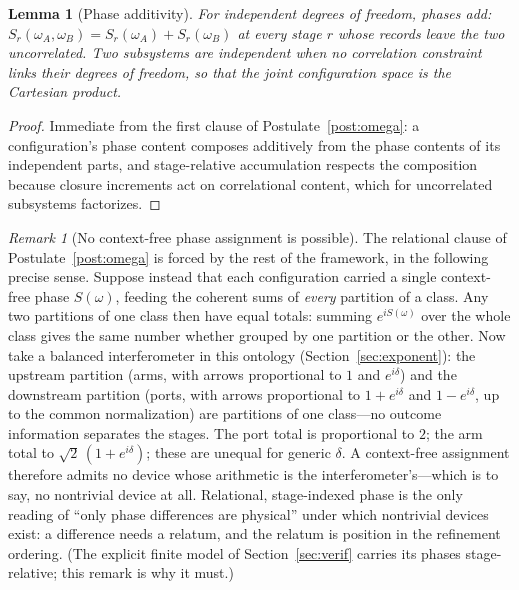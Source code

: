 \documentclass[11pt]{article}
\newtheorem{lemma}{Lemma}
\theoremstyle{definition}
\theoremstyle{remark}
\newtheorem{remark}{Remark}
\begin{document}
\begin{lemma}[Phase additivity]\label{lem:pa}
For independent degrees of freedom, phases add: $S_r(\omega_A, \omega_B) = S_r(\omega_A) + S_r(\omega_B)$ at every stage $r$ whose records leave the two uncorrelated. Two subsystems are independent when no correlation constraint links their degrees of freedom, so that the joint configuration space is the Cartesian product.
\end{lemma}
\begin{proof}
Immediate from the first clause of Postulate~\ref{post:omega}: a configuration's phase content composes additively from the phase contents of its independent parts, and stage-relative accumulation respects the composition because closure increments act on correlational content, which for uncorrelated subsystems factorizes.
\end{proof}
\begin{remark}[No context-free phase assignment is possible]\label{rem:nofree}
The relational clause of Postulate~\ref{post:omega} is forced by the rest of the framework, in the following precise sense. Suppose instead that each configuration carried a single context-free phase $S(\omega)$, feeding the coherent sums of \emph{every} partition of a class. Any two partitions of one class then have equal totals: summing $e^{iS(\omega)}$ over the whole class gives the same number whether grouped by one partition or the other. Now take a balanced interferometer in this ontology (Section~\ref{sec:exponent}): the upstream partition (arms, with arrows proportional to $1$ and $e^{i\delta}$) and the downstream partition (ports, with arrows proportional to $1 + e^{i\delta}$ and $1 - e^{i\delta}$, up to the common normalization) are partitions of one class---no outcome information separates the stages. The port total is proportional to $2$; the arm total to $\sqrt 2\,(1 + e^{i\delta})$; these are unequal for generic $\delta$. A context-free assignment therefore admits no device whose arithmetic is the interferometer's---which is to say, no nontrivial device at all. Relational, stage-indexed phase is the only reading of ``only phase differences are physical'' under which nontrivial devices exist: a difference needs a relatum, and the relatum is position in the refinement ordering. (The explicit finite model of Section~\ref{sec:verif} carries its phases stage-relative; this remark is why it must.)
\end{remark}
\end{document}
